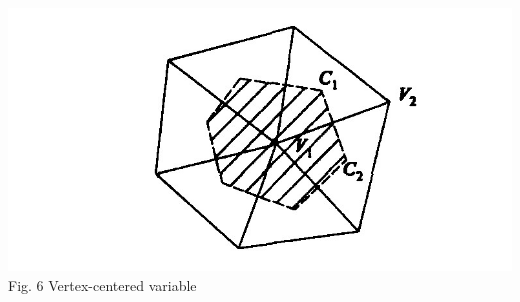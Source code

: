 \documentclass[a0,portrait]{a0poster}
\begin{document}
\begin{multicols}{2}
\begin{multicols}{2}
		\begin{center}
			\includegraphics[width=\linewidth]{pic/vertex.jpg}\\
			\vspace{-0.5cm}
			{\color{Green} Fig. 6 Vertex-centered variable}
		\end{center}
	\end{multicols}
	\setlength\columnseprule{3pt}

\color{SaddleBrown}

\end{multicols}
\end{document}

